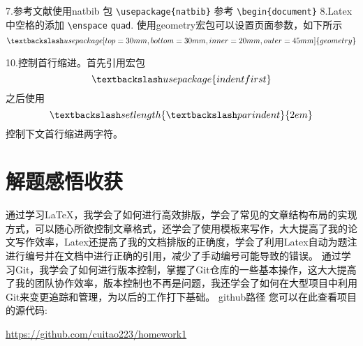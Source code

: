 \documentclass{article}
\begin{document}
7.参考文献使用natbib 包\newline
\verb|\usepackage{natbib}|\newline
参考\newline
\verb|\begin{document}|\newline
8.Latex中空格的添加\newline
\verb|\enspace|\newline
\verb|quad|. 使用geometry宏包可以设置页面参数，如下所示\newline
\[\textbackslash usepackage[top = 30mm, bottom = 30mm, inner = 20mm, outer = 45mm]\{geometry\}\]

10.控制首行缩进。首先引用宏包
\[\textbackslash usepackage\{indentfirst\}\]之后使用
\[\textbackslash setlength\{\textbackslash parindent\}\{2em\}\]控制下文首行缩进两字符。


\section{解题感悟收获}
 通过学习LaTeX，我学会了如何进行高效排版，学会了常见的文章结构布局的实现方式，可以随心所欲控制文章格式，还学会了使用模板来写作，大大提高了我的论文写作效率，Latex还提高了我的文档排版的正确度，学会了利用Latex自动为题注进行编号并在文档中进行正确的引用，减少了手动编号可能导致的错误。\newline
 通过学习Git，我学会了如何进行版本控制，掌握了Git仓库的一些基本操作，这大大提高了我的团队协作效率，版本控制也不再是问题，我还学会了如何在大型项目中利用Git来变更追踪和管理，为以后的工作打下基础。
github路径
您可以在此查看项目的源代码: 

\url{https://github.com/cuitao223/homework1}
\end{document}
